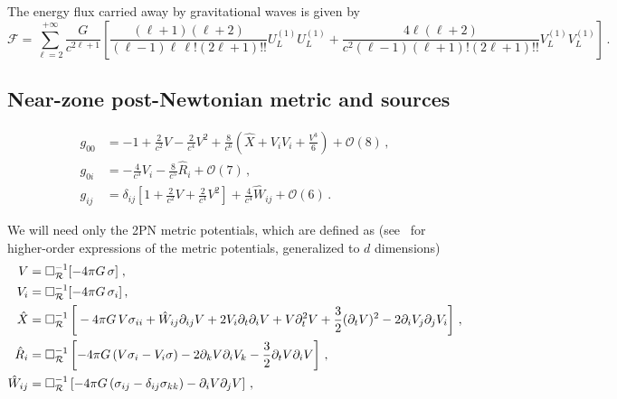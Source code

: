 \documentclass[
superscriptaddress,
preprint,
prd,tightenlines,showpacs,nofootinbib,
eqsecnum,
amsfonts,amsmath,amssymb]{revtex4-1}
\newcommand{\calO}{\mathcal{O}}
\begin{document}
The energy flux carried away by gravitational waves is given by 
\begin{equation}\label{flux}
  \mathcal{F} = \sum_{\ell = 2}^{+ \infty} \frac{G}{c^{2\ell+1}} \left[ \frac{(\ell+1)(\ell+2)}{(\ell-1) \ell \, \ell! (2\ell+1)!!} U_L^{(1)} U_L^{(1)} + \frac{4\ell (\ell+2)}{c^2 (\ell-1) (\ell+1)!  (2\ell+1)!!} V_L^{(1)}V_L^{(1)}\right]\,.
\end{equation}


\subsection{Near-zone post-Newtonian metric and sources}
\label{subsec:summarymetric}

\begin{subequations}\label{eq:metricg}
\begin{align} 
  g_{00} &=  -1 + \frac{2}{c^{2}}V - \frac{2}{c^{4}} V^{2} + \frac{8}{c^{6}}
  \left(\hat{X} + V_{i} V_{i} + \frac{V^{3}}{6}\right) +\calO(8)\,,\\ 
  g_{0i} & = - \frac{4}{c^{3}}
  V_{i} - \frac{8}{c^{5}} \hat{R}_{i} + \calO(7)\,,\\ 
  g_{ij} & = \delta_{ij} \left[1 +
    \frac{2}{c^{2}}V + \frac{2}{c^{4}} V^{2} \right] + 
  \frac{4}{c^{4}}\hat{W}_{ij} + \calO(6) \,.
\end{align}
\end{subequations}\noindent

We will need only the 2PN metric potentials, which are defined as (see~\cite{} for higher-order expressions of the metric potentials, generalized to $d$ dimensions)
\begin{subequations}\label{eq:defpotentials}
\begin{align}
  V & = \Box_{\mathcal{R}}^{-1}[-4 \pi G\, \sigma]\;,\label{V} \\ 
  V_{i} &= \Box_{\mathcal{R}}^{-1}[-4 \pi G\, \sigma_{i}]\,, \\
  \hat{X} &= \Box_{\mathcal{R}}^{-1}\left[\vphantom{\frac{1}{2}} - 4 \pi G\, V \sigma_{ii} + \hat{W}_{ij}\partial_{ij} V + 2 V_{i} \partial_{t} \partial_{i} V + V \partial_{t}^{2}V+ \frac{3}{2}(\partial_{t} V)^{2} - 2\partial_{i} V_{j}\partial_{j} V_{i}\right] \,, \\
  \hat{R}_{i} & = \Box_{\mathcal{R}}^{-1}\left[-4 \pi G\, (V \sigma_{i} - V_{i} \sigma) - 2\partial_{k} V \partial_{i} V_{k} - \frac{3}{2} \partial_{t} V \partial_{i} V\right]\,, \\ 
  \hat{W}_{ij} & =  \Box_{{\cal R}}^{-1}\left[-4 \pi G\, (\sigma_{ij} - \delta_{ij} \sigma_{kk}) - \partial_{i} V \partial_{j}V\right]\,, \label{Wij} 
\end{align}
\end{subequations}
\end{document}
